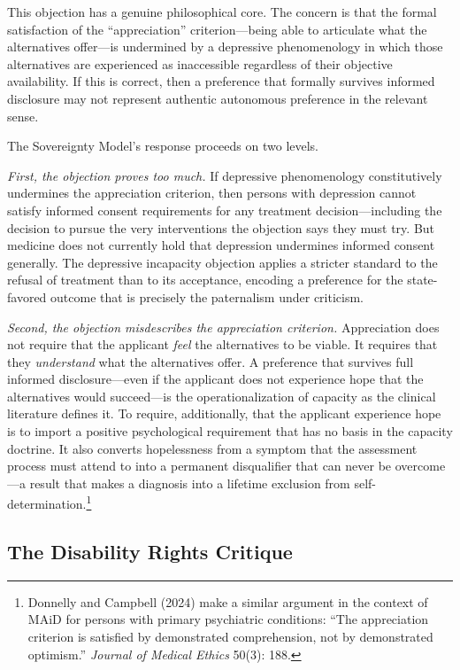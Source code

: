 \documentclass[11pt, letterpaper]{article}
\begin{document}
This objection has a genuine philosophical core. The concern is that the formal
satisfaction of the ``appreciation'' criterion---being able to articulate what
the alternatives offer---is undermined by a depressive phenomenology in which
those alternatives are experienced as inaccessible regardless of their objective
availability. If this is correct, then a preference that formally survives informed
disclosure may not represent authentic autonomous preference in the relevant sense.

The Sovereignty Model's response proceeds on two levels.

\textit{First, the objection proves too much.} If depressive phenomenology
constitutively undermines the appreciation criterion, then persons with depression
cannot satisfy informed consent requirements for any treatment decision---including
the decision to pursue the very interventions the objection says they must try.
But medicine does not currently hold that depression undermines informed consent
generally. The depressive incapacity objection applies a stricter standard to the
refusal of treatment than to its acceptance, encoding a preference for the
state-favored outcome that is precisely the paternalism under criticism.

\textit{Second, the objection misdescribes the appreciation criterion.} Appreciation
does not require that the applicant \textit{feel} the alternatives to be viable.
It requires that they \textit{understand} what the alternatives offer. A preference
that survives full informed disclosure---even if the applicant does not experience
hope that the alternatives would succeed---is the operationalization of capacity
as the clinical literature defines it. To require, additionally, that the applicant
experience hope is to import a positive psychological requirement that has no basis
in the capacity doctrine. It also converts hopelessness from a symptom that the
assessment process must attend to into a permanent disqualifier that can never be
overcome---a result that makes a diagnosis into a lifetime exclusion from
self-determination.\footnote{%
  Donnelly and Campbell (2024) make a similar argument in the context of MAiD
  for persons with primary psychiatric conditions: ``The appreciation criterion
  is satisfied by demonstrated comprehension, not by demonstrated optimism.''
  \textit{Journal of Medical Ethics} 50(3): 188.}

\subsection{The Disability Rights Critique}
\end{document}
